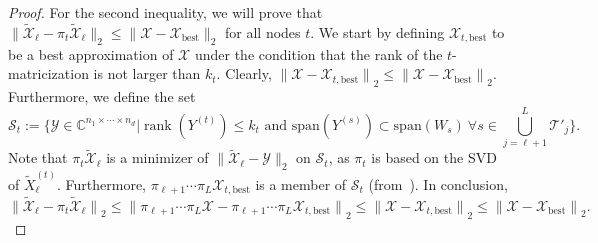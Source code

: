 \documentclass[11pt, a4paper]{article}
\newcommand{\calS}{\mathcal{S}}
\newcommand{\calT}{\mathcal{T}}
\newcommand{\calX}{\mathcal{X}}
\newcommand{\calY}{\mathcal{Y}}
\newcommand{\C}{{\mathbb C}}
\DeclareMathOperator{\rank}{rank}
\newcommand{\normb}[1]{{\bigl\|#1\bigr\|}}
\renewcommand{\tilde}{\widetilde}
\begin{document}
\begin{preprint}
\begin{proof}
 For the second inequality, we will prove that $\|\tilde{\calX}_\ell -
 \pi_t \tilde{\calX}_\ell \|_2 \le \|\calX - \calX_{\text{best}}\|_2$ for all
 nodes $t$. We start by defining $\calX_{t,\text{best}}$ to be a best
 approximation of $\calX$ under the condition that the rank of the $t$-matricization is not larger than
 $k_t$. Clearly, $\normb{ \calX - \calX_{t,\text{best}} }_2 \le \normb{
   \calX - \calX_{\text{best}} }_2$. Furthermore, we define the set 
\[
    \calS_t := \big\{ \calY \in \C^{n_1 \times \cdots \times n_d} \big| \rank
    (Y^{(t)}) \le k_t \text{ and } \text{span}(Y^{(s)}) \subset
    \text{span}(W_s) \ \forall s \in \bigcup_{j=\ell+1}^L \calT'_j \big\}.
\]
Note that $\pi_t
\tilde{\calX}_\ell$ is a minimizer of $\|\tilde{\calX}_\ell - \calY\|_2$
on $\calS_t$, as $\pi_t$ is based on the SVD of
$\tilde{X}_\ell^{(t)}$. Furthermore, $\pi_{\ell+1} \cdots \pi_L
\calX_{t,\text{best}}$ is a member of $\calS_t$ (from~\cite[Lemma
  3.15]{Gra10}). In conclusion,
  \[
  \normb{ \tilde{\calX}_\ell - \pi_t \tilde{\calX}_\ell}_2 
  \le \normb{ \pi_{\ell+1} \cdots \pi_L \calX - \pi_{\ell+1} \cdots \pi_L
  \calX_{t,\text{best}} }_2 
  \le \normb{ \calX - \calX_{t,\text{best}} }_2 
  \le \normb{ \calX - \calX_{\text{best}} }_2.
  \]
\end{proof}
%


\end{preprint}
\end{document}
